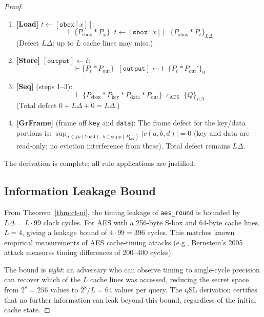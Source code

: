 \documentclass[acmsmall,sigplan,anonymous,review,screen]{acmart}
\theoremstyle{plain}
\theoremstyle{definition}
\newcommand{\qSL}{\textsc{qSL}\xspace}
\newcommand{\fp}{\mathit{fp}}
\newcommand{\sep}{*}
\begin{document}
\begin{proof}
\begin{enumerate}[label=\arabic*.,itemsep=2pt]
  \item \textbf{[Load]}  $t \leftarrow [\texttt{sbox}[x]]$:
    \[
      \vdash \{P_{\mathrm{sbox}} \sep P_x\}\;\;
      t \leftarrow [\texttt{sbox}[x]]\;\;
      \{P_{\mathrm{sbox}} \sep P_t\}_{L\Delta}
    \]
    (Defect $L\Delta$: up to $L$ cache lines may miss.)

  \item \textbf{[Store]}  $[\texttt{output}] \leftarrow t$:
    \[
      \vdash \{P_t \sep P_{\mathrm{out}}\}\;\;
      [\texttt{output}] \leftarrow t\;\;
      \{P_t \sep P_{\mathrm{out}}'\}_0
    \]

  \item \textbf{[Seq]} (steps 1--3):
    \[
      \vdash \{P_{\mathrm{sbox}} \sep P_{\mathrm{key}} \sep P_{\mathrm{data}}
        \sep P_{\mathrm{out}}\}\;\;
      c_{\mathrm{AES}}\;\;
      \{Q\}_{L\Delta}
    \]
    (Total defect $0 + L\Delta + 0 = L\Delta$.)

  \item \textbf{[GrFrame]} (frame off \texttt{key} and \texttt{data}):
    The frame defect for the key/data portions is:
    $\sup_{a \in \fp(\texttt{load}),\, b \in \mathrm{supp}(P_{\mathrm{key}})} |c(a, b, d)|
    = 0$ (key and data are read-only; no eviction interference from these).
    Total defect remains $L\Delta$.
\end{enumerate}

The derivation is complete; all rule applications are justified.

\subsection{Information Leakage Bound}
\label{sec:casestudy:leak}

From Theorem~\ref{thm:ct-ni}, the timing leakage of \texttt{aes\_round}
is bounded by $L\Delta = L \cdot 99$ clock cycles.  For AES with a
256-byte S-box and 64-byte cache lines, $L = 4$, giving a leakage bound
of $4 \cdot 99 = 396$ cycles.  This matches known empirical measurements
of AES cache-timing attacks (e.g., Bernstein's 2005 attack measures
timing differences of 200--400 cycles).

The bound is \emph{tight}: an adversary who can observe timing to single-cycle
precision can recover which of the $L$ cache lines was accessed, reducing
the secret space from $2^8 = 256$ values to $2^8 / L = 64$ values per query.
The \qSL derivation certifies that no further information can leak beyond
this bound, regardless of the initial cache state.


\end{proof}
\end{document}
